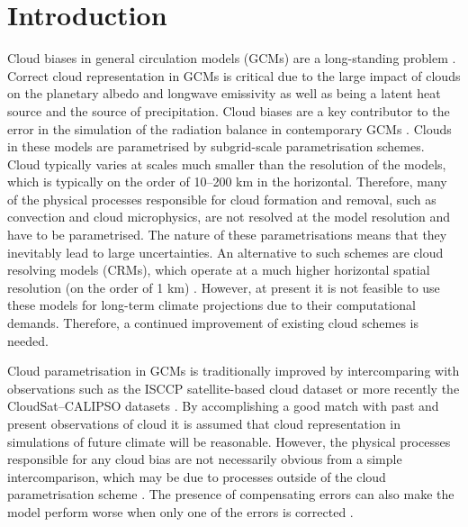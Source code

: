 
\section{Introduction}

Cloud biases in general circulation models (GCMs) are a long-standing problem
\citep{trenberth2010,vignesh2020}. Correct cloud representation in GCMs is critical due
to the large impact of clouds on the planetary albedo and longwave emissivity as well as
being a latent heat source and the source of precipitation. Cloud biases are a key contributor to the error in the
simulation of the radiation balance 
in contemporary GCMs \citep{li2013}. Clouds in these models are parametrised by subgrid-scale parametrisation schemes. Cloud typically varies at scales much smaller
than the resolution of the models, which is typically on the order of 10--200 km in the horizontal. Therefore, many of the physical
processes responsible for cloud formation and removal, such as convection and cloud microphysics, are not resolved at the
model resolution and have to be parametrised. The nature of these parametrisations means that they inevitably lead to large uncertainties. An alternative to such schemes are cloud resolving models
(CRMs), which operate at a much higher horizontal spatial resolution (on the order of 1 km)
\citep{guichard2017,satoh2019}.
However, at present it is not feasible to use these models for long-term climate
projections due to their computational demands. Therefore, a continued improvement of
existing cloud schemes is needed.

Cloud parametrisation in GCMs is traditionally improved by intercomparing with
observations such as the ISCCP satellite-based cloud dataset \citep{rossow1991}
or more recently the CloudSat--CALIPSO datasets
\citep{stephens2002,winker2003}. By accomplishing a good match with past and
present observations of cloud it is assumed that cloud representation in
simulations of future climate will be reasonable. However, the physical
processes responsible for any cloud bias are not necessarily obvious from a simple
intercomparison, which may be due to processes outside of the cloud
parametrisation scheme \citep{morcrette2010}. The presence of compensating
errors can also make the model perform worse when only one of the errors is
corrected \citep{hourdin2017,schuddeboom2019}.

